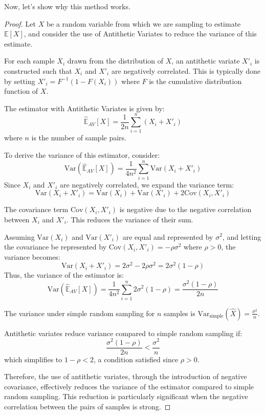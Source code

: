 \documentclass{report}
\begin{document}
Now, let's show why this method works.

\begin{proof}
    Let \( X \) be a random variable from which we are sampling to estimate \( \mathbb{E}[X] \), and consider the use of Antithetic Variates to reduce the variance of this estimate.

       For each sample \( X_i \) drawn from the distribution of \( X \), an antithetic variate \( X'_i \) is constructed such that \( X_i \) and \( X'_i \) are negatively correlated. This is typically done by setting \( X'_i = F^{-1}(1 - F(X_i)) \) where \( F \) is the cumulative distribution function of \( X \).

       The estimator with Antithetic Variates is given by:
       \[ \hat{\mathbb{E}}_{AV}[X] = \frac{1}{2n} \sum_{i=1}^{n} (X_i + X'_i) \]
       where \( n \) is the number of sample pairs.

       To derive the variance of this estimator, consider:
       \[ \mathrm{Var}(\hat{\mathbb{E}}_{AV}[X]) = \frac{1}{4n^2} \sum_{i=1}^{n} \mathrm{Var}(X_i + X'_i) \]
       Since \( X_i \) and \( X'_i \) are negatively correlated, we expand the variance term:
       \[ \mathrm{Var}(X_i + X'_i) = \mathrm{Var}(X_i) + \mathrm{Var}(X'_i) + 2\mathrm{Cov}(X_i, X'_i) \]

       The covariance term \( \mathrm{Cov}(X_i, X'_i) \) is negative due to the negative correlation between \( X_i \) and \( X'_i \). This reduces the variance of their sum.

       Assuming \( \mathrm{Var}(X_i) \) and \( \mathrm{Var}(X'_i) \) are equal and represented by \( \sigma^2 \), and letting the covariance be represented by \( \mathrm{Cov}(X_i, X'_i) = -\rho\sigma^2 \) where \( \rho > 0 \), the variance becomes:
       \[ \mathrm{Var}(X_i + X'_i) = 2\sigma^2 - 2\rho\sigma^2 = 2\sigma^2(1 - \rho) \]
    Thus, the variance of the estimator is:
    \[ \mathrm{Var}(\hat{\mathbb{E}}_{AV}[X]) = \frac{1}{4n^2} \sum_{i=1}^{n} 2\sigma^2(1 - \rho) = \frac{\sigma^2(1 - \rho)}{2n} \]

    The variance under simple random sampling for \( n \) samples is \( \mathrm{Var}_{\text{simple}}(\hat{X}) = \frac{\sigma^2}{n} \).

    Antithetic variates reduce variance compared to simple random sampling if:
    \[ \frac{\sigma^2(1 - \rho)}{2n} < \frac{\sigma^2}{n} \]
    which simplifies to \( 1 - \rho < 2 \), a condition satisfied since \( \rho > 0 \).

    Therefore, the use of antithetic variates, through the introduction of negative covariance, effectively reduces the variance of the estimator compared to simple random sampling. This reduction is particularly significant when the negative correlation between the pairs of samples is strong.
\end{proof}
\end{document}
